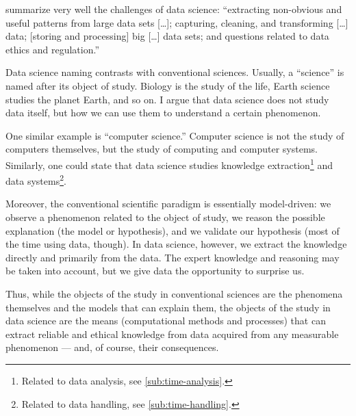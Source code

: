 \textcite{Kelleher2018} summarize very well the challenges of data science:
``extracting non-obvious and useful patterns from large data sets [\dots]; capturing,
cleaning, and transforming [\dots] data; [storing and processing] big [\dots] data sets;
and questions related to data ethics and regulation.''

Data science naming contrasts with conventional sciences.  Usually, a ``science'' is named after
its object of study.  Biology is the study of the life, Earth science studies the planet
Earth, and so on.  I argue that data science does not study data itself, but how we can
use them to understand a certain phenomenon.

One similar example is ``computer science.''  Computer science is not the study of
computers themselves, but the study of computing and computer systems.  Similarly, one
could state that data science studies knowledge extraction\footnote{Related to data
analysis, see \cref{sub:time-analysis}.} and data systems\footnote{Related to data
handling, see \cref{sub:time-handling}.}.

Moreover, the conventional scientific paradigm is
essentially model-driven: we observe a phenomenon related to the object of study, we
reason the possible explanation (the model or hypothesis), and we validate our hypothesis
(most of the time using data, though).  In data science, however, we extract the knowledge
directly and primarily from the data.  The expert knowledge and reasoning may be taken
into account, but we give data the opportunity to surprise us.

Thus, while the objects of the study in conventional sciences are the phenomena themselves
and the models that can explain them, the objects of the study in data
science are the means (computational methods and processes) that can extract reliable and ethical
knowledge from data acquired from any measurable phenomenon --- and, of course, their
consequences.

\def\verrids{(0,0) circle (20mm)}
\def\verrist{(-2.5,0) circle (15mm)}
\def\verride {(2.5,0) circle (15mm)}
\def\verrics {(0,-2.5) circle (15mm)}

